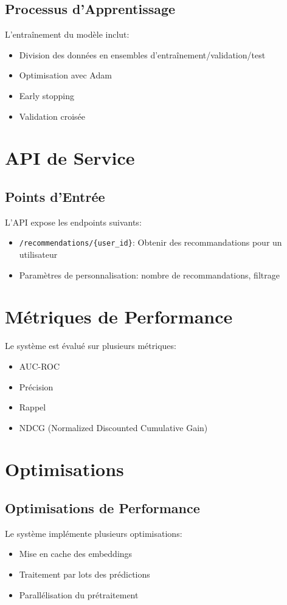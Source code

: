 \documentclass[12pt,a4paper]{article}
\begin{document}
\subsection{Processus d'Apprentissage}
L'entraînement du modèle inclut:
\begin{itemize}
    \item Division des données en ensembles d'entraînement/validation/test
    \item Optimisation avec Adam
    \item Early stopping
    \item Validation croisée
\end{itemize}

\section{API de Service}
\subsection{Points d'Entrée}
L'API expose les endpoints suivants:
\begin{itemize}
    \item \texttt{/recommendations/\{user\_id\}}: Obtenir des recommandations pour un utilisateur
    \item Paramètres de personnalisation: nombre de recommandations, filtrage
\end{itemize}

\section{Métriques de Performance}
Le système est évalué sur plusieurs métriques:
\begin{itemize}
    \item AUC-ROC
    \item Précision
    \item Rappel
    \item NDCG (Normalized Discounted Cumulative Gain)
\end{itemize}

\section{Optimisations}
\subsection{Optimisations de Performance}
Le système implémente plusieurs optimisations:
\begin{itemize}
    \item Mise en cache des embeddings
    \item Traitement par lots des prédictions
    \item Parallélisation du prétraitement
\end{itemize}
\end{document}
